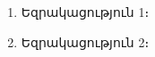 {
	\begin{enumerate}
		\item 
		Եզրակացություն 1։
		
		\item
		Եզրակացություն 2։
		
	\end{enumerate}
}
